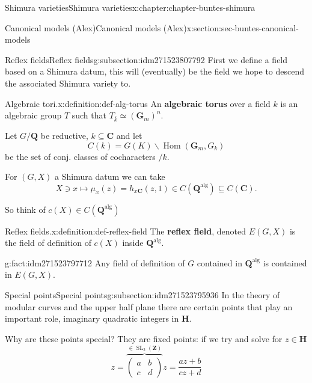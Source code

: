 \documentclass[oneside,10pt,]{book}
\newcommand{\terminology}[1]{\textbf{#1}}
\numberwithin{equation}{section}
\newcommand{\ZZ}{\mathbf{Z}}
\newcommand{\QQ}{\mathbf{Q}}
\newcommand{\CC}{\mathbf{C}}
\newcommand{\alg}{\mathrm{alg}}
\DeclareMathOperator{\Hom}{Hom}
\DeclareMathOperator{\SL}{SL}
\newcommand{\amp}{&}
\begin{document}
\begin{chapterptx}{Shimura varieties}{}{Shimura varieties}{}{}{x:chapter:chapter-buntes-shimura}
\begin{sectionptx}{Canonical models (Alex)}{}{Canonical models (Alex)}{}{}{x:section:sec-buntes-canonical-models}
%
\begin{subsectionptx}{Reflex fields}{}{Reflex fields}{}{}{g:subsection:idm271523807792}
First we define a field based on a Shimura datum, this will (eventually) be the field we hope to descend the associated Shimura variety to.%
\begin{definition}{Algebraic tori.}{x:definition:def-alg-torus}%
An \terminology{algebraic torus} over a field  \(k \) is an algebraic group \(T\) such that \(T_{\bar k} \simeq (\mathbf G_m)^n\).%
\end{definition}
Let \(G/\QQ\) be reductive, \(k \subseteq \CC\) and let%
\begin{equation*}
C(k) = G(K) \backslash \Hom(\mathbf G_m, G_k)
\end{equation*}
be the set of conj. classes of cocharacters \(/k\).%
\par
For \((G,X)\) a Shimura datum we can take%
\begin{equation*}
X \ni x \mapsto \mu_x(z) = h_{x\CC} (z,1) \in C(\QQ^\alg) \subseteq C(\CC)\text{.}
\end{equation*}
%
\par
So think of \(c(X) \in C(\QQ^\alg)\)%
\begin{definition}{Reflex fields.}{x:definition:def-reflex-field}%
The \terminology{reflex field}, denoted \(E(G,X)\) is the field of definition of \(c(X)\) inside \(\QQ^\alg\).%
\end{definition}
\begin{fact}{}{}{g:fact:idm271523797712}%
Any field of definition of \(G\) contained in \(\QQ^\alg\) is contained in \(E(G,X)\).%
\end{fact}
\end{subsectionptx}
%
%
\typeout{************************************************}
\typeout{************************************************}
%
\begin{subsectionptx}{Special points}{}{Special points}{}{}{g:subsection:idm271523795936}
In the theory of modular curves and the upper half plane there are certain points that play an important role, imaginary quadratic integers in \(\mathbf H\).%
\par
Why are these points special? They are fixed points: if we try and solve for \(z \in \mathbf H\)%
\begin{equation*}
z=  \overbrace{\begin{pmatrix} a\amp b \\ c \amp d\end{pmatrix}}^{\in \SL_2(\ZZ)} z = \frac{az + b}{cz+d}

\end{equation*}
\end{subsectionptx}
\end{sectionptx}
\end{chapterptx}
\end{document}
